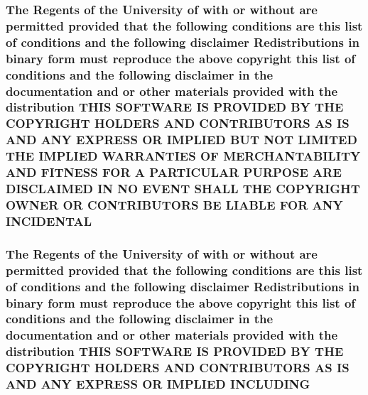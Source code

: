 \hypertarget{_l_i_c_e_n_s_e_a84960be3d0abae92fe44514f2b6ae3a2}{
\subsubsection[{I\+N\+C\+I\+D\+E\+N\+T\+A\+L}]{\setlength{\rightskip}{0pt plus 5cm}The Regents of the University of with or without are permitted provided that the following conditions are this list of conditions and the following disclaimer Redistributions in binary form must reproduce the above copyright this list of conditions and the following disclaimer in the documentation and or other materials provided with the distribution T\+H\+I\+S S\+O\+F\+T\+W\+A\+R\+E I\+S P\+R\+O\+V\+I\+D\+E\+D B\+Y T\+H\+E C\+O\+P\+Y\+R\+I\+G\+H\+T H\+O\+L\+D\+E\+R\+S A\+N\+D C\+O\+N\+T\+R\+I\+B\+U\+T\+O\+R\+S A\+S I\+S A\+N\+D A\+N\+Y E\+X\+P\+R\+E\+S\+S O\+R I\+M\+P\+L\+I\+E\+D B\+U\+T N\+O\+T L\+I\+M\+I\+T\+E\+D T\+H\+E I\+M\+P\+L\+I\+E\+D {\bf W\+A\+R\+R\+A\+N\+T\+I\+E\+S} O\+F M\+E\+R\+C\+H\+A\+N\+T\+A\+B\+I\+L\+I\+T\+Y A\+N\+D F\+I\+T\+N\+E\+S\+S F\+O\+R A P\+A\+R\+T\+I\+C\+U\+L\+A\+R P\+U\+R\+P\+O\+S\+E A\+R\+E D\+I\+S\+C\+L\+A\+I\+M\+E\+D I\+N N\+O E\+V\+E\+N\+T S\+H\+A\+L\+L T\+H\+E C\+O\+P\+Y\+R\+I\+G\+H\+T O\+W\+N\+E\+R O\+R C\+O\+N\+T\+R\+I\+B\+U\+T\+O\+R\+S B\+E L\+I\+A\+B\+L\+E F\+O\+R A\+N\+Y I\+N\+C\+I\+D\+E\+N\+T\+A\+L}}\label{_l_i_c_e_n_s_e_a84960be3d0abae92fe44514f2b6ae3a2}
\hypertarget{_l_i_c_e_n_s_e_a4cc4ede62f5367a5ba66dc92278c86dc}{
\subsubsection[{I\+N\+C\+L\+U\+D\+I\+N\+G}]{\setlength{\rightskip}{0pt plus 5cm}The Regents of the University of with or without are permitted provided that the following conditions are this list of conditions and the following disclaimer Redistributions in binary form must reproduce the above copyright this list of conditions and the following disclaimer in the documentation and or other materials provided with the distribution T\+H\+I\+S S\+O\+F\+T\+W\+A\+R\+E I\+S P\+R\+O\+V\+I\+D\+E\+D B\+Y T\+H\+E C\+O\+P\+Y\+R\+I\+G\+H\+T H\+O\+L\+D\+E\+R\+S A\+N\+D C\+O\+N\+T\+R\+I\+B\+U\+T\+O\+R\+S A\+S I\+S A\+N\+D A\+N\+Y E\+X\+P\+R\+E\+S\+S O\+R I\+M\+P\+L\+I\+E\+D I\+N\+C\+L\+U\+D\+I\+N\+G}}\label{_l_i_c_e_n_s_e_a4cc4ede62f5367a5ba66dc92278c86dc}
